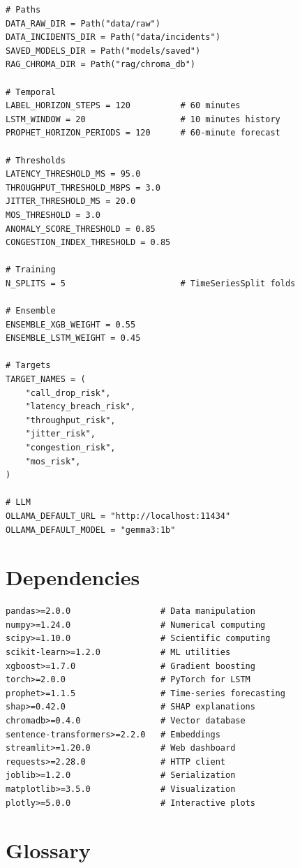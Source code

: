 \documentclass[11pt,a4paper,oneside]{report}
\begin{document}
\begin{lstlisting}
# Paths
DATA_RAW_DIR = Path("data/raw")
DATA_INCIDENTS_DIR = Path("data/incidents")
SAVED_MODELS_DIR = Path("models/saved")
RAG_CHROMA_DIR = Path("rag/chroma_db")

# Temporal
LABEL_HORIZON_STEPS = 120          # 60 minutes
LSTM_WINDOW = 20                   # 10 minutes history
PROPHET_HORIZON_PERIODS = 120      # 60-minute forecast

# Thresholds
LATENCY_THRESHOLD_MS = 95.0
THROUGHPUT_THRESHOLD_MBPS = 3.0
JITTER_THRESHOLD_MS = 20.0
MOS_THRESHOLD = 3.0
ANOMALY_SCORE_THRESHOLD = 0.85
CONGESTION_INDEX_THRESHOLD = 0.85

# Training
N_SPLITS = 5                       # TimeSeriesSplit folds

# Ensemble
ENSEMBLE_XGB_WEIGHT = 0.55
ENSEMBLE_LSTM_WEIGHT = 0.45

# Targets
TARGET_NAMES = (
    "call_drop_risk",
    "latency_breach_risk",
    "throughput_risk",
    "jitter_risk",
    "congestion_risk",
    "mos_risk",
)

# LLM
OLLAMA_DEFAULT_URL = "http://localhost:11434"
OLLAMA_DEFAULT_MODEL = "gemma3:1b"
\end{lstlisting}

\chapter{Dependencies}

\begin{lstlisting}
pandas>=2.0.0                  # Data manipulation
numpy>=1.24.0                  # Numerical computing
scipy>=1.10.0                  # Scientific computing
scikit-learn>=1.2.0            # ML utilities
xgboost>=1.7.0                 # Gradient boosting
torch>=2.0.0                   # PyTorch for LSTM
prophet>=1.1.5                 # Time-series forecasting
shap>=0.42.0                   # SHAP explanations
chromadb>=0.4.0                # Vector database
sentence-transformers>=2.2.0   # Embeddings
streamlit>=1.20.0              # Web dashboard
requests>=2.28.0               # HTTP client
joblib>=1.2.0                  # Serialization
matplotlib>=3.5.0              # Visualization
plotly>=5.0.0                  # Interactive plots
\end{lstlisting}

\chapter{Glossary}
\end{document}
